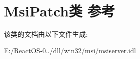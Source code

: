 \hypertarget{class_msi_patch}{}\section{Msi\+Patch类 参考}
\label{class_msi_patch}


该类的文档由以下文件生成\+:\begin{DoxyCompactItemize}
\item 
E\+:/\+React\+O\+S-\/0../dll/win32/msi/msiserver.\+idl\end{DoxyCompactItemize}
